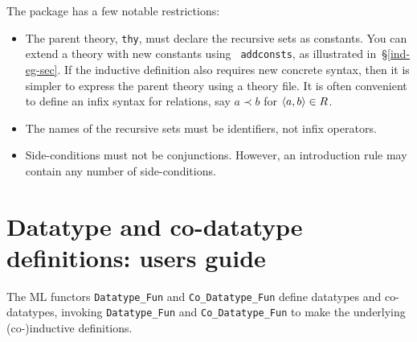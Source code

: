 The package has a few notable restrictions:
\begin{itemize}
\item The parent theory, {\tt thy}, must declare the recursive sets as
  constants.  You can extend a theory with new constants using {\tt
    addconsts}, as illustrated in~\S\ref{ind-eg-sec}.  If the inductive
  definition also requires new concrete syntax, then it is simpler to
  express the parent theory using a theory file.  It is often convenient to
  define an infix syntax for relations, say $a\prec b$ for $\langle a,b\rangle\in
  R$.

\item The names of the recursive sets must be identifiers, not infix
operators.  

\item Side-conditions must not be conjunctions.  However, an introduction rule
may contain any number of side-conditions.
\end{itemize}


\section{Datatype and co-datatype definitions: users guide}
The ML functors \verb|Datatype_Fun| and \verb|Co_Datatype_Fun| define datatypes
and co-datatypes, invoking \verb|Datatype_Fun| and
\verb|Co_Datatype_Fun| to make the underlying (co-)inductive definitions. 


